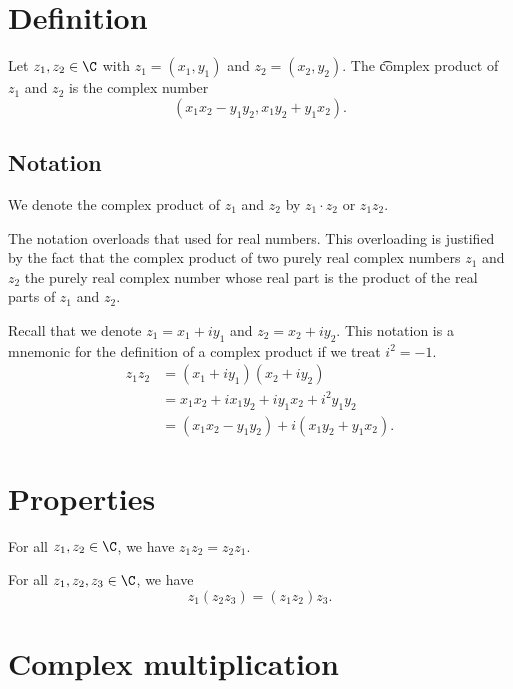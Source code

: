 

\section*{Definition}

Let $z_1, z_2 \in \C $ with $z_1 = (x_1, y_1)$ and $z_2 = (x_2, y_2)$.
The \t{complex product} of $z_1$ and $z_2$ is the complex number
\[
(x_1x_2 - y_1y_2, x_1y_2 + y_1x_2).
\]

\subsection*{Notation}

We denote the complex product of $z_1$ and $z_2$ by $z_1 \cdot  z_2$ or $z_1z_2$.

The notation overloads that used for real numbers.
This overloading is justified by the fact that the complex product of two purely real complex numbers $z_1$ and $z_2$ the purely real complex number whose real part is the product of the real parts of $z_1$ and $z_2$.

Recall that we denote $z_1 = x_1 + iy_1$ and $z_2 = x_2 + iy_2$.
This notation is a mnemonic for the definition of a complex product if we treat $i^2 = -1$.
\[
\begin{aligned}
z_1z_2 &= (x_1 + iy_1)(x_2 + iy_2) \\
&= x_1x_2 + ix_1y_2 + iy_1x_2 + i^2 y_1y_2 \\
&= (x_1x_2 - y_1y_2) + i(x_1y_2 + y_1x_2).
\end{aligned}
\]

\section*{Properties}

\begin{proposition}[Commutativity]
For all $z_1, z_2 \in \C $, we have $z_1z_2 = z_2z_1$.
\end{proposition}

\begin{proposition}[Associativity]
For all $z_1, z_2, z_3 \in \C $, we have
\[
z_1(z_2z_3) = (z_1z_2)z_3.
\]
\end{proposition}

\section*{Complex multiplication}

